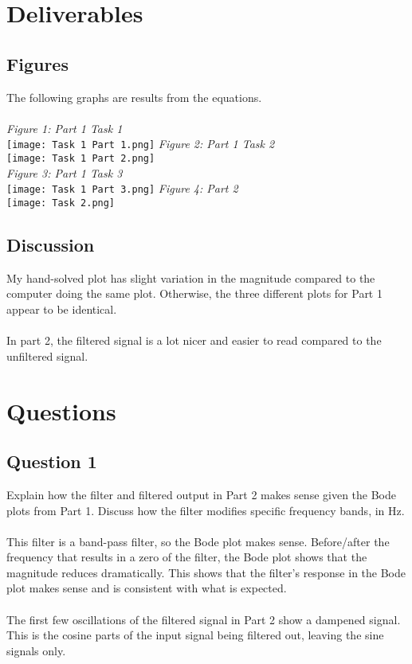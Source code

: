 \documentclass[12pt,a4paper]{article}
\begin{document}
\section{Deliverables}
\subsection{Figures}
The following graphs are results from the equations.\\
\\
\textit{Figure 1: Part 1 Task 1}
\\
\texttt{[image: Task 1 Part 1.png]}
\newpage
\textit{Figure 2: Part 1 Task 2}
\\
\texttt{[image: Task 1 Part 2.png]}
\\
\textit{Figure 3: Part 1 Task 3}
\\
\texttt{[image: Task 1 Part 3.png]}
\newpage
\textit{Figure 4: Part 2}
\\
\texttt{[image: Task 2.png]}
\subsection{Discussion}
My hand-solved plot has slight variation in the magnitude compared to the computer doing the same plot. Otherwise, the three different plots for Part 1 appear to be identical.\\
\\
In part 2, the filtered signal is a lot nicer and easier to read compared to the unfiltered signal.
\section{Questions}
\subsection{Question 1}
Explain how the filter and filtered output in Part 2 makes sense given the Bode plots from Part 1. Discuss how the filter modifies specific frequency bands, in Hz.\\
\\
This filter is a band-pass filter, so the Bode plot makes sense. Before/after the frequency that results in a zero of the filter, the Bode plot shows that the magnitude reduces dramatically. This shows that the filter's response in the Bode plot makes sense and is consistent with what is expected.\\
\\
The first few oscillations of the filtered signal in Part 2 show a dampened signal. This is the cosine parts of the input signal being filtered out, leaving the sine signals only.
\end{document}
